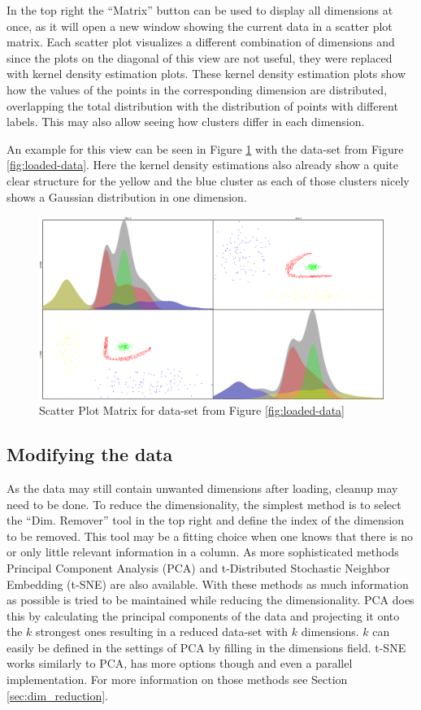 \documentclass[
	a4paper,
	english,
	twoside,
	openright,               
	11pt                            
	]{report}
\begin{document}
In the top right the ``Matrix'' button can be used to display all dimensions at once, as it will open a new window showing the current data in a scatter plot matrix. Each scatter plot visualizes a different combination of dimensions and since the plots on the diagonal of this view are not useful, they were replaced with kernel density estimation plots. These kernel density estimation plots show how the values of the points in the corresponding dimension are distributed, overlapping the total distribution with the distribution of points with different labels. This may also allow seeing how clusters differ in each dimension. 

An example for this view can be seen in Figure \ref{fig:scatter_matrix} with the data-set from Figure \ref{fig:loaded-data}. Here the kernel density estimations also already show a quite clear structure for the yellow and the blue cluster as each of those clusters nicely shows a Gaussian distribution in one dimension.

\begin{figure}[h]
	\centering
	\includegraphics[scale=.25]{scatter_matrix}
	\caption{Scatter Plot Matrix for data-set from Figure \ref{fig:loaded-data}}
	\label{fig:scatter_matrix}
\end{figure}

\subsection{Modifying the data}

As the data may still contain unwanted dimensions after loading, cleanup may need to be done. To reduce the dimensionality, the simplest method is to select the ``Dim. Remover'' tool in the top right and define the index of the dimension to be removed. This tool may be a fitting choice when one knows that there is no or only little relevant information in a column. As more sophisticated methods Principal Component Analysis (PCA) \cite{pca} and t-Distributed Stochastic Neighbor Embedding (t-SNE) \cite{Maaten2008VisualizingDU} are also available. With these methods as much information as possible is tried to be maintained while reducing the dimensionality. PCA does this by calculating the principal components of the data and projecting it onto the $k$ strongest ones resulting in a reduced data-set with $k$ dimensions. $k$ can easily be defined in the settings of PCA by filling in the dimensions field. t-SNE works similarly to PCA, has more options though and even a parallel implementation. For more information on those methods see Section \ref{sec:dim_reduction}.
\end{document}
